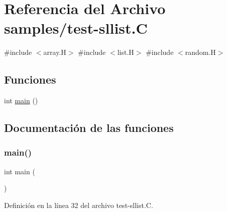 \hypertarget{test-sllist_8_c}{}\section{Referencia del Archivo samples/test-\/sllist.C}
\label{test-sllist_8_c}
{\ttfamily \#include $<$array.\+H$>$}\newline
{\ttfamily \#include $<$list.\+H$>$}\newline
{\ttfamily \#include $<$random.\+H$>$}\newline
\subsection*{Funciones}
\begin{DoxyCompactItemize}
\item 
int \hyperlink{test-sllist_8_c_ae66f6b31b5ad750f1fe042a706a4e3d4}{main} ()
\end{DoxyCompactItemize}


\subsection{Documentación de las funciones}
\mbox{\label{test-sllist_8_c_ae66f6b31b5ad750f1fe042a706a4e3d4}} 
\subsubsection{\texorpdfstring{main()}{main()}}
{\footnotesize\ttfamily int main (\begin{DoxyParamCaption}{ }\end{DoxyParamCaption})}



Definición en la línea 32 del archivo test-\/sllist.\+C.

